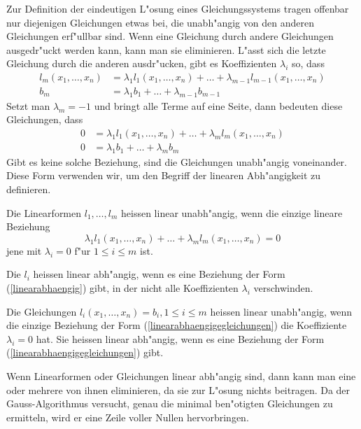 Zur Definition der eindeutigen L"osung eines Gleichungssystems 
tragen offenbar nur diejenigen Gleichungen etwas bei, die unabh"angig
von den anderen Gleichungen erf"ullbar sind. Wenn eine Gleichung
durch andere Gleichungen ausgedr"uckt werden kann, kann man sie
eliminieren. L"asst sich die letzte Gleichung durch die
anderen ausdr"ucken, gibt es Koeffizienten $\lambda_i$ so, dass
\begin{equation*}
\begin{aligned}
l_m(x_1,\dots,x_n)&=\lambda_1 l_1(x_1,\dots,x_n)+\dots+\lambda_{m-1}l_{m-1}(x_1,\dots, x_n)\\
b_m&=\lambda_1b_1+\dots+\lambda_{m-1}b_{m-1}
\end{aligned}
\end{equation*}
Setzt man $\lambda_m=-1$ und bringt alle Terme auf eine Seite,
dann bedeuten diese Gleichungen, dass
\begin{equation}
\begin{aligned}
0&=\lambda_1l_1(x_1,\dots,x_n)+\dots+\lambda_ml_m(x_1,\dots,x_n)\\
0&=\lambda_1b_1+\dots+\lambda_mb_m
\end{aligned}
\label{linearabhaengigegleichungen}
\end{equation}
Gibt es keine solche Beziehung, sind die Gleichungen unabh"angig
voneinander.
Diese Form verwenden wir, um den Begriff der linearen Abh"angigkeit
zu definieren.
\begin{definition}
Die Linearformen $l_1,\dots,l_m$ heissen linear unabh"angig,
wenn die einzige lineare Beziehung
\begin{equation}
\lambda_1l_1(x_1,\dots,x_n)+\dots+\lambda_ml_m(x_1,\dots,x_n)=0
\label{linearabhaengig}
\end{equation}
jene mit $\lambda_i=0$ f"ur $1\le i\le m$ ist.

Die $l_i$ heissen linear abh"angig, wenn es eine Beziehung der Form
(\ref{linearabhaengig})
gibt, in der nicht alle Koeffizienten $\lambda_i$ verschwinden.

Die Gleichungen $l_i(x_1,\dots,x_n)=b_i,1\le i\le m$ heissen linear unabh"angig,
wenn  die einzige Beziehung der Form (\ref{linearabhaengigegleichungen})
die Koeffiziente $\lambda_i=0$ hat. Sie heissen linear abh"angig, wenn
es eine Beziehung der Form (\ref{linearabhaengigegleichungen}) gibt.
\end{definition}

Wenn Linearformen oder Gleichungen linear abh"angig sind, dann kann
man eine oder mehrere von ihnen eliminieren, da sie zur L"osung nichts
beitragen.
Da der Gauss-Algorithmus versucht, genau die minimal ben"otigten Gleichungen
zu ermitteln, wird er eine Zeile voller Nullen hervorbringen.

